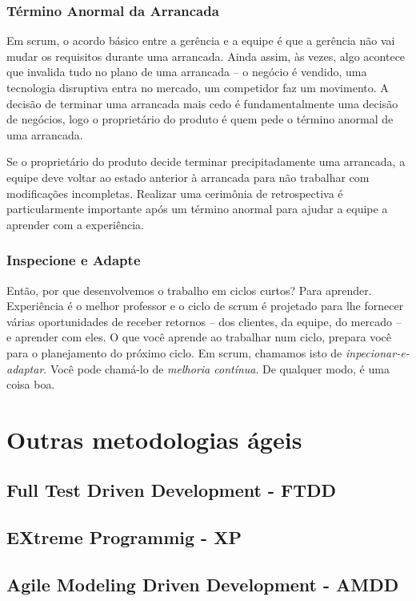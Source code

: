 \documentclass[
	11pt,				%
	openright,
	twoside,			%
	a4paper,			%
	english,			%
	french,
	brazil,				%
	sumario=tradicional
	]{abntex2}
\begin{document}
\subsubsection{Término Anormal da Arrancada}

Em scrum, o acordo básico entre a gerência e a equipe é que a gerência não vai mudar os requisitos durante uma arrancada. Ainda assim, às vezes, algo acontece que invalida tudo no plano de uma arrancada -- o negócio é vendido, uma tecnologia disruptiva entra no mercado, um competidor faz um movimento. A decisão de terminar uma arrancada mais cedo é fundamentalmente uma decisão de negócios, logo o proprietário do produto é quem pede o término anormal de uma arrancada.

Se o proprietário do produto decide terminar precipitadamente uma arrancada, a equipe deve voltar ao estado anterior à arrancada para não trabalhar com modificações incompletas. Realizar uma cerimônia de retrospectiva é particularmente importante após um término anormal para ajudar a equipe a aprender com a experiência.

\subsubsection{Inspecione e Adapte}

Então, por que desenvolvemos o trabalho em ciclos curtos? Para aprender. Experiência é o melhor professor e o ciclo de scrum é projetado para lhe fornecer várias oportunidades de receber retornos -- dos clientes, da equipe, do mercado -- e aprender com eles.
O que você aprende ao trabalhar num ciclo, prepara você para o planejamento do próximo ciclo. Em scrum, chamamos isto de \emph{inpecionar-e-adaptar}. Você pode chamá-lo de \emph{melhoria contínua}. De qualquer modo, é uma coisa boa.

\section{Outras metodologias ágeis}
\subsection{Full Test Driven Development - FTDD}
\subsection{EXtreme Programmig - XP}
\subsection{Agile Modeling Driven Development - AMDD}
\end{document}
